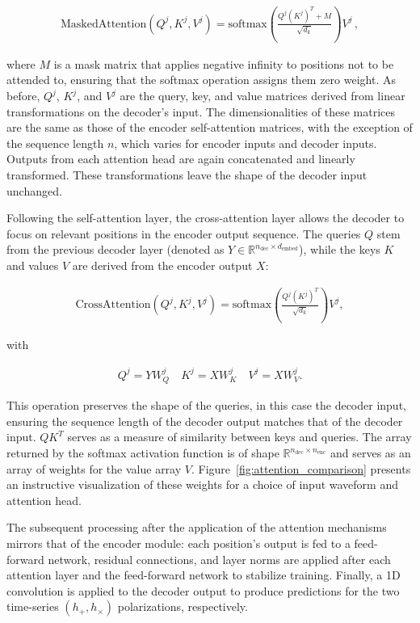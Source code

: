 \documentclass[12pt]{iopart}
\begin{document}
\begin{align}
\text{MaskedAttention}(Q^j, K^j, V^j) = \text{softmax}\left(\frac{Q^j (K^j)^T + M}{\sqrt{d_k}}\right)V^j\,,
\end{align}

where \(M\) is a mask matrix that applies negative infinity to positions not to be attended to, ensuring that the softmax operation assigns them zero weight. As before, \(Q^j\), \(K^j\), and \(V^j\) are the query, key, and value matrices derived from linear transformations on the decoder's input. The dimensionalities of these matrices are the same as those of the encoder self-attention matrices, with the exception of the sequence length \(n\), which varies for encoder inputs and decoder inputs. Outputs from each attention head are again concatenated and linearly transformed. These transformations leave the shape of the decoder input unchanged.

Following the self-attention layer, the cross-attention layer allows the decoder to focus on relevant positions in the encoder output sequence. The queries \(Q\) stem from the previous decoder layer (denoted as \(Y \in \mathbb{R}^{n_{\text{dec}} \times d_{\text{embed}}}\)), while the keys \(K\) and values \(V\) are derived from the encoder output \(X\):

\begin{align}
\text{CrossAttention}(Q^j, K^j, V^j) = \text{softmax}\left(\frac{Q^j (K^j)^T}{\sqrt{d_k}}\right)V^j,
\end{align}

with

\begin{align}
    Q^j = Y W_Q^j \quad K^j = X W_K^j \quad V^j = X W_V^j. 
\end{align}

This operation preserves the shape of the queries, in this case the decoder input, ensuring the sequence length of the decoder output matches that of the decoder input. \(Q K^T\) serves as a measure of similarity between keys and queries. The array returned by the softmax activation function is of shape \(\mathbb{R}^{n_{\text{dec}} \times n_{\text{enc}}}\) and serves as an array of weights for the value array \(V\). Figure~\ref{fig:attention_comparison} presents an instructive visualization of these weights for a choice of input waveform and attention head.

The subsequent processing after the application of the attention mechanisms mirrors that of the encoder module: each position's output is fed to a feed-forward network, residual connections, and layer norms are applied after each attention layer and the feed-forward network to stabilize training. Finally, a 1D convolution is applied to the decoder output to produce predictions for the two time-series \((h_+, h_\times)\) polarizations, respectively.
\end{document}

